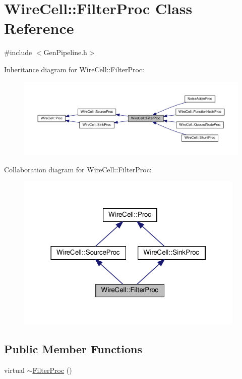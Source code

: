 \hypertarget{class_wire_cell_1_1_filter_proc}{}\section{Wire\+Cell\+:\+:Filter\+Proc Class Reference}
\label{class_wire_cell_1_1_filter_proc}


{\ttfamily \#include $<$Gen\+Pipeline.\+h$>$}



Inheritance diagram for Wire\+Cell\+:\+:Filter\+Proc\+:
\nopagebreak
\begin{figure}[H]
\begin{center}
\leavevmode
\includegraphics[width=350pt]{class_wire_cell_1_1_filter_proc__inherit__graph}
\end{center}
\end{figure}


Collaboration diagram for Wire\+Cell\+:\+:Filter\+Proc\+:
\nopagebreak
\begin{figure}[H]
\begin{center}
\leavevmode
\includegraphics[width=310pt]{class_wire_cell_1_1_filter_proc__coll__graph}
\end{center}
\end{figure}
\subsection*{Public Member Functions}
\begin{DoxyCompactItemize}
\item 
virtual \hyperlink{class_wire_cell_1_1_filter_proc_a215b7b7f0a6c85d332888d18bb1d18d5}{$\sim$\+Filter\+Proc} ()
\end{DoxyCompactItemize}


